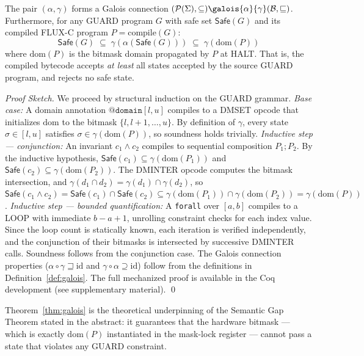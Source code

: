 \documentclass[conference]{IEEEtran}
\begin{document}
\begin{theorem}
\label{thm:galois}
The pair $(\alpha, \gamma)$ forms a Galois connection
$(\mathcal{P}(\Sigma), \subseteq) \galois{\alpha}{\gamma} (\mathcal{B}, \sqsubseteq)$.
Furthermore, for any GUARD program $G$ with safe set $\mathsf{Safe}(G)$
and its compiled FLUX-C program $P = \mathrm{compile}(G)$:
\[
  \mathsf{Safe}(G) \;\subseteq\; \gamma(\alpha(\mathsf{Safe}(G)))
  \;\subseteq\; \gamma(\mathrm{dom}(P))
\]
where $\mathrm{dom}(P)$ is the bitmask domain propagated by $P$ at HALT.
That is, the compiled bytecode accepts \emph{at least} all states accepted
by the source GUARD program, and rejects no safe state.
\end{theorem}

\begin{proof}[Proof Sketch]
We proceed by structural induction on the GUARD grammar.
\emph{Base case:} A domain annotation $\texttt{@domain}[l, u]$ compiles
to a DMSET opcode that initializes $\mathrm{dom}$ to the bitmask
$\{l, l+1, \ldots, u\}$.
By definition of $\gamma$, every state $\sigma \in [l, u]$ satisfies
$\sigma \in \gamma(\mathrm{dom}(P))$, so soundness holds trivially.
\emph{Inductive step — conjunction:} An invariant $c_1 \wedge c_2$
compiles to sequential composition $P_1; P_2$.
By the inductive hypothesis, $\mathsf{Safe}(c_1) \subseteq \gamma(\mathrm{dom}(P_1))$
and $\mathsf{Safe}(c_2) \subseteq \gamma(\mathrm{dom}(P_2))$.
The DMINTER opcode computes the bitmask intersection, and
$\gamma(d_1 \cap d_2) = \gamma(d_1) \cap \gamma(d_2)$,
so $\mathsf{Safe}(c_1 \wedge c_2) = \mathsf{Safe}(c_1) \cap \mathsf{Safe}(c_2)
\subseteq \gamma(\mathrm{dom}(P_1)) \cap \gamma(\mathrm{dom}(P_2))
= \gamma(\mathrm{dom}(P))$.
\emph{Inductive step — bounded quantification:} A \texttt{forall} over $[a, b]$
compiles to a LOOP with immediate $b - a + 1$, unrolling constraint checks
for each index value. Since the loop count is statically known, each
iteration is verified independently, and the conjunction of their bitmasks
is intersected by successive DMINTER calls. Soundness follows from the
conjunction case.
The Galois connection properties ($\alpha \circ \gamma \sqsupseteq \mathrm{id}$
and $\gamma \circ \alpha \supseteq \mathrm{id}$) follow from the definitions
in Definition~\ref{def:galois}.
The full mechanized proof is available in the Coq development
(see supplementary material). \qed
\end{proof}

\noindent
Theorem~\ref{thm:galois} is the theoretical underpinning of the
Semantic Gap Theorem stated in the abstract: it guarantees that
the hardware bitmask — which is exactly $\mathrm{dom}(P)$ instantiated
in the mask-lock register — cannot pass a state that violates any GUARD
constraint.
\end{document}
